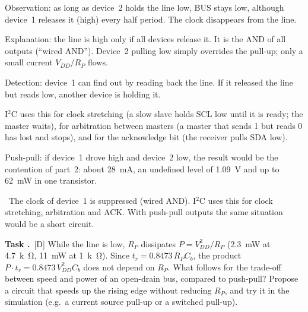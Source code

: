 \documentclass[a4paper,11pt]{article}
\newcounter{task}[section]
\renewcommand{\thetask}{\thesection.\arabic{task}}
\newcommand{\task}[1]{\par\medskip\refstepcounter{task}%
  {\sffamily\bfseries\color{rwuviolet}Task \thetask}\ {\sffamily\small\color{rwucyandark}[#1]}\quad}
\newenvironment{solution}{\begin{solbox}}{\end{solbox}}
\newcommand{\answer}{\par\smallskip{\sffamily\bfseries\color{rwuviolet}Answer:}\ }
\begin{document}
\begin{solution}
\begin{steps}
  \item Observation: as long as device~2 holds the line low, BUS stays low, although device~1 releases it
        (high) every half period. The clock disappears from the line.
  \item Explanation: the line is high only if all devices release it. It is the AND of all outputs
        (``wired AND''). Device~2 pulling low simply overrides the pull-up; only a small current
        $V_{DD}/R_P$ flows.
  \item Detection: device~1 can find out by reading back the line. If it released the line but reads low,
        another device is holding it.
  \item I$^2$C uses this for clock stretching (a slow slave holds SCL low until it is ready; the master waits),
        for arbitration between masters (a master that sends 1 but reads 0 has lost and stops), and for the
        acknowledge bit (the receiver pulls SDA low).
  \item Push-pull: if device~1 drove high and device~2 low, the result would be the contention of part~2:
        about \SI{28}{mA}, an undefined level of \SI{1.09}{V} and up to \SI{62}{mW} in one transistor.
\end{steps}
\answer The clock of device~1 is suppressed (wired AND). I$^2$C uses this for clock stretching, arbitration and
ACK. With push-pull outputs the same situation would be a short circuit.
\end{solution}

\task{D} While the line is low, $R_P$ dissipates $P=V_{DD}^2/R_P$ (\SI{2.3}{mW} at \SI{4.7}{k\ohm}, \SI{11}{mW} at
\SI{1}{k\ohm}). Since $t_r=0.8473\,R_PC_b$, the product $P\cdot t_r=0.8473\,V_{DD}^2C_b$ does not depend on $R_P$.
What follows for the trade-off between speed and power of an open-drain bus, compared to push-pull? Propose a
circuit that speeds up the rising edge without reducing $R_P$, and try it in the simulation (e.g.\ a current
source pull-up or a switched pull-up).
\end{document}
